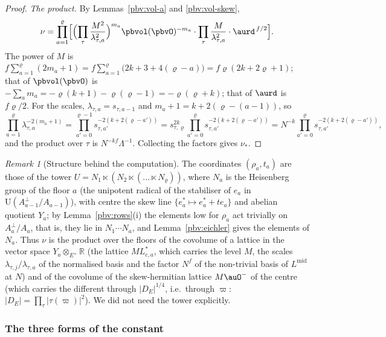 \documentclass[10pt]{amsart}
\theoremstyle{definition}
\theoremstyle{remark}
\newtheorem{remark}[theorem]{Remark}
\newcommand{\R}{\mathbb R}
\providecommand{\auU}{\mathrm U}
\begin{document}
\begin{proof}
\emph{The product.} By Lemmas~\ref{pbv:vol-a} and \ref{pbv:vol-skew},
\[
\nu=\prod_{a=1}^{\varrho}\Bigl[\Bigl(\prod_\tau\frac{M^2}{\lambda_{\tau,a}^2}\Bigr)^{m_a}\pbvol(\pbvO)^{-m_a}\cdot
\prod_\tau\frac M{\lambda_{\tau,a}^2}\cdot\aurd^{\,f/2}\Bigr].
\]
The power of $M$ is $f\sum_{a=1}^{\varrho}(2m_a+1)=f\sum_{a=1}^\varrho\bigl(2k+3+4(\varrho-a)\bigr)=f\varrho(2k+2\varrho
+1)$; that of $\pbvol(\pbvO)$ is $-\sum_am_a=-\varrho(k+1)-\varrho(\varrho-1)=-\varrho(\varrho+k)$; that of $\aurd$ is
$f\varrho/2$. For the scales, $\lambda_{\tau,a}=s_{\tau,a-1}$ and $m_a+1=k+2(\varrho-(a-1))$, so
\[
\prod_{a=1}^{\varrho}\lambda_{\tau,a}^{-2(m_a+1)}=\prod_{a'=0}^{\varrho-1}s_{\tau,a'}^{-2(k+2(\varrho-a'))}=
s_{\tau,\varrho}^{2k}\prod_{a'=0}^{\varrho}s_{\tau,a'}^{-2(k+2(\varrho-a'))}=N^{-k}\prod_{a'=0}^{\varrho}
s_{\tau,a'}^{-2(k+2(\varrho-a'))},
\]
and the product over $\tau$ is $N^{-kf}\Lambda^{-1}$. Collecting the factors gives $\nu_*$.
\end{proof}

\begin{remark}[Structure behind the computation]\label{pbv:rem-tower}
The coordinates $(\rho_a,t_a)$ are those of the tower $U=N_1\ltimes(N_2\ltimes(\dots\ltimes N_\varrho))$, where
$N_a$ is the Heisenberg group of the floor $a$ (the unipotent radical of the stabiliser of $e_a$ in
$\auU(A_{a-1}^\perp/A_{a-1})$), with centre the skew line $\{e_a^*\mapsto e_a^*+te_a\}$ and abelian quotient
$Y_a$; by Lemma~\ref{pbv:rows}(i) the elements low for $\rho_a$ act trivially on $A_a^\perp/A_a$, that is, they lie in $N_1\cdots N_a$, and
Lemma~\ref{pbv:eichler} gives the elements of $N_a$. Thus $\nu$ is the product over the floors of the
covolume of a lattice in the vector space $Y_a\otimes_{E^+}\R$ (the lattice $M L_{c,a}^*$, which carries the
level $M$, the scales $\lambda_{\tau,j}/\lambda_{\tau,a}$ of the normalised basis and the factor $N^f$ of the
non-trivial basis of $L^{\mathrm{mid}}$ at $N$) and of the covolume of the skew-hermitian lattice $M\auO^-$
of the centre (which carries the different through $|D_E|^{1/4}$, i.e.\ through $\varpi$: $|D_E|=\prod_\tau
|\tau(\varpi)|^2$). We did not need the tower explicitly.
\end{remark}

\subsubsection{The three forms of the constant}\label{pbv:ss-uses}
\end{document}
